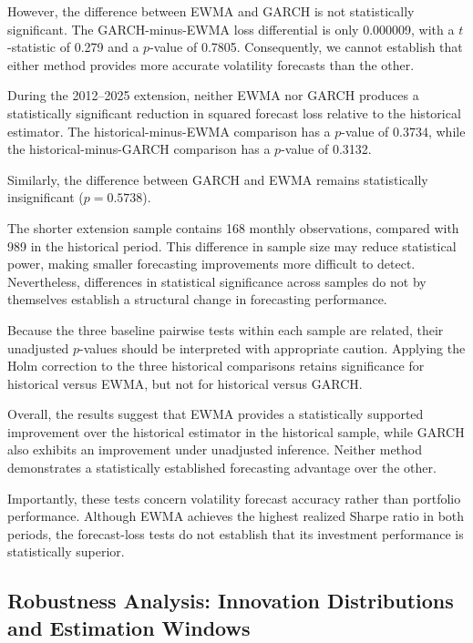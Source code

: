\documentclass[11pt]{article}
\begin{document}
However, the difference between EWMA and
GARCH is not statistically significant.
The GARCH-minus-EWMA loss differential is
only 0.000009, with a $t$-statistic of
0.279 and a $p$-value of 0.7805.
Consequently, we cannot establish that
either method provides more accurate
volatility forecasts than the other.

During the 2012--2025 extension, neither
EWMA nor GARCH produces a statistically
significant reduction in squared forecast
loss relative to the historical estimator.
The historical-minus-EWMA comparison
has a $p$-value of 0.3734, while the
historical-minus-GARCH comparison has
a $p$-value of 0.3132.

Similarly, the difference between GARCH
and EWMA remains statistically
insignificant ($p=0.5738$).

The shorter extension sample contains
168 monthly observations, compared with
989 in the historical period. This
difference in sample size may reduce
statistical power, making smaller
forecasting improvements more difficult
to detect. Nevertheless, differences
in statistical significance across
samples do not by themselves establish
a structural change in forecasting
performance.

Because the three baseline pairwise tests
within each sample are related, their
unadjusted $p$-values should be interpreted
with appropriate caution. Applying the
Holm correction to the three historical
comparisons retains significance for
historical versus EWMA, but not for
historical versus GARCH.

Overall, the results suggest that EWMA
provides a statistically supported
improvement over the historical estimator
in the historical sample, while GARCH
also exhibits an improvement under
unadjusted inference. Neither method
demonstrates a statistically established
forecasting advantage over the other.

Importantly, these tests concern
volatility forecast accuracy rather
than portfolio performance. Although
EWMA achieves the highest realized
Sharpe ratio in both periods, the
forecast-loss tests do not establish
that its investment performance is
statistically superior.



\subsection{Robustness Analysis: Innovation Distributions and Estimation Windows}
\label{subsec:garch_robustness}
\end{document}
